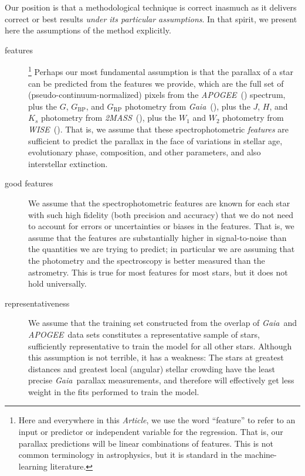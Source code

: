 \documentclass[modern]{aastex62}
\newcommand{\documentname}{\textsl{Article}}
\newcommand{\acronym}[1]{{\small{#1}}}
\newcommand{\project}[1]{\textsl{#1}}
\newcommand{\apogee}{\project{\acronym{APOGEE}}}
\newcommand{\gaia}{\project{Gaia}}
\newcommand{\wise}{\project{\acronym{WISE}}}
\newcommand{\zmass}{\project{\acronym{2MASS}}}
\newcommand{\BP}{{G_\mathrm{BP}}}
\newcommand{\RP}{{G_\mathrm{RP}}}
\begin{document}
Our position is that a methodological technique is correct inasmuch as
it delivers correct or best results \emph{under its particular assumptions}.
In that spirit, we present here the assumptions of the method
explicitly.
\begin{description}
\item[features]\footnote{Here and everywhere in this \documentname, we
  use the word ``feature'' to refer to an input or predictor or
  independent variable for the regression.
  That is, our parallax predictions will be linear combinations of features.
  This is not common terminology in astrophysics, but it is standard in the machine-learning literature.}
Perhaps our most fundamental assumption is that the parallax
of a star can be predicted from the features we provide, which are
the full set of (pseudo-continuum-normalized) pixels from the \apogee\ (\citealt{apogee}) spectrum,
plus the $G$, $\BP$, and $\RP$ photometry from \gaia\ (\citealt{gaia}),
plus the $J$, $H$, and $K_s$ photometry from \zmass\ (\citealt{zmass}),
plus the $W_1$ and $W_2$ photometry from \wise\ (\citealt{wise}).
That is, we assume that these spectrophotometric \emph{features} are sufficient
to predict the parallax in the face of variations in stellar
age, evolutionary phase, composition, and other parameters, and also interstellar
extinction.

\item[good features] We assume that the spectrophotometric features are known for
each star with such high fidelity (both precision and accuracy) that we do not
need to account for errors or uncertainties or biases in the features.
That is, we assume that the features are substantially higher in signal-to-noise than the
quantities we are trying to predict; in particular we are assuming that the photometry
and the spectroscopy is better measured than the astrometry.
This is true for most features for most stars, but it does not hold universally.

\item[representativeness] We assume that the training set constructed from the overlap
of \gaia\ and \apogee\ data sets constitutes a representative sample of stars,
sufficiently representative to train the model for all other stars.
Although this assumption is not terrible, it has a weakness:
The stars at greatest distances and greatest local (angular) stellar crowding have
the least precise \gaia\ parallax measurements, and therefore will effectively get
less weight in the fits performed to train the model.


\end{description}
\end{document}
